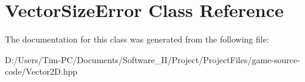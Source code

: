 \hypertarget{class_vector_size_error}{}\section{Vector\+Size\+Error Class Reference}
\label{class_vector_size_error}


The documentation for this class was generated from the following file\+:\begin{DoxyCompactItemize}
\item 
D\+:/\+Users/\+Tim-\/\+P\+C/\+Documents/\+Software\+\_\+\+I\+I/\+Project/\+Project\+Files/game-\/source-\/code/Vector2\+D.\+hpp\end{DoxyCompactItemize}
